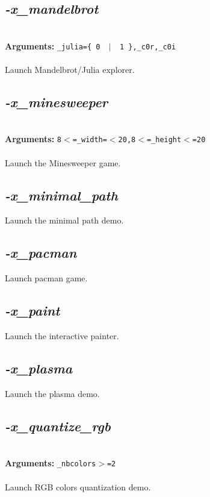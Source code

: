 \documentclass[a4paper,11pt,twoside]{book}
\begin{document}
\subsection{\emph{-x\_mandelbrot} }\vspace*{-0.5em}
~\\\textbf{Arguments: } 
{\small \texttt{\_julia=\{ 0 ~$|$~ 1 \},\_c0r,\_c0i}}\\~\\
Launch Mandelbrot/Julia explorer.


\subsection{\emph{-x\_minesweeper} }\vspace*{-0.5em}
~\\\textbf{Arguments: } 
{\small \texttt{8$<$=\_width=$<$20,8$<$=\_height$<$=20}}\\~\\
Launch the Minesweeper game.


\subsection{\emph{-x\_minimal\_path} }\vspace*{-0.5em}
Launch the minimal path demo.


\subsection{\emph{-x\_pacman} }\vspace*{-0.5em}
Launch pacman game.


\subsection{\emph{-x\_paint} }\vspace*{-0.5em}
Launch the interactive painter.


\subsection{\emph{-x\_plasma} }\vspace*{-0.5em}
Launch the plasma demo.


\subsection{\emph{-x\_quantize\_rgb} }\vspace*{-0.5em}
~\\\textbf{Arguments: } 
{\small \texttt{\_nbcolors$>$=2}}\\~\\
Launch RGB colors quantization demo.
\end{document}
